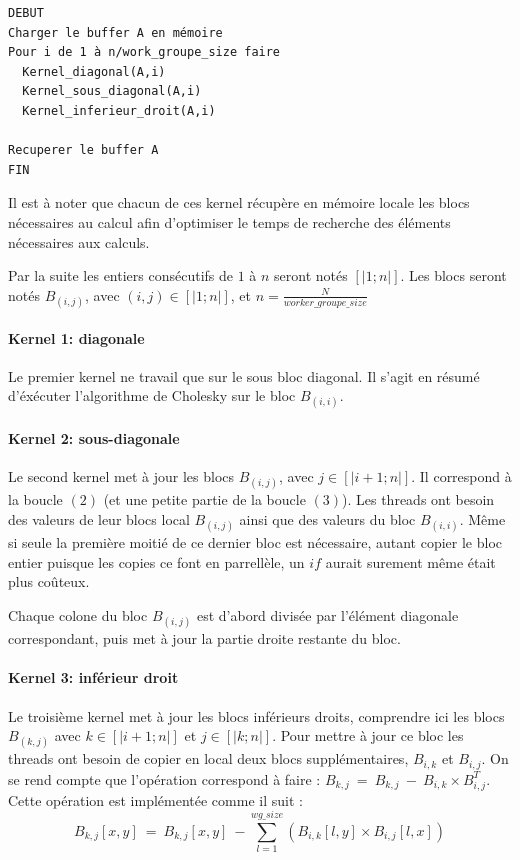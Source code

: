 \documentclass[paper=a4, fontsize=11pt]{scrartcl} %
\numberwithin{equation}{section} %
\numberwithin{figure}{section} %
\numberwithin{table}{section} %
\begin{document}
\begin{verbatim}
DEBUT
Charger le buffer A en mémoire
Pour i de 1 à n/work_groupe_size faire
  Kernel_diagonal(A,i)
  Kernel_sous_diagonal(A,i)
  Kernel_inferieur_droit(A,i)

Recuperer le buffer A
FIN
\end{verbatim}

Il est à noter que chacun de ces kernel récupère en mémoire locale les
blocs nécessaires au calcul afin d'optimiser le temps de recherche des
éléments nécessaires aux calculs.

Par la suite les entiers consécutifs de $1$ à $n$ seront notés
$[|1;n|]$. Les blocs seront notés $B_{(i,j)}$, avec $(i,j)\in[|1;n|]$,
et $n = \frac{N}{worker\_groupe\_size}$


\paragraph{Kernel 1: diagonale}

Le premier kernel ne travail que sur le sous bloc diagonal. Il s'agit
en résumé d'éxécuter l'algorithme de Cholesky sur le bloc $B_{(i,i)}$.

\paragraph{Kernel 2: sous-diagonale} 

Le second kernel met à jour les blocs $B_{(i,j)}$, avec
$j\in[|i+1;n|]$. Il correspond à la boucle $(2)$ (et une petite partie
de la boucle $(3)$).  Les threads ont besoin des valeurs de leur blocs
local $B_{(i,j)}$ ainsi que des valeurs du bloc $B_{(i,i)}$. Même si
seule la première moitié de ce dernier bloc est nécessaire, autant
copier le bloc entier puisque les copies ce font en parrellèle, un
$if$ aurait surement même était plus coûteux.

Chaque colone du bloc $B_{(i,j)}$ est d'abord divisée par l'élément
diagonale correspondant, puis met à jour la partie droite restante du
bloc.

\paragraph{Kernel 3: inférieur droit} 

Le troisième kernel met à jour les blocs inférieurs droits, comprendre
ici les blocs $B_{(k,j)}$ avec $k\in[|i+1;n|]$ et $j\in[|k;n|]$. Pour
mettre à jour ce bloc les threads ont besoin de copier en local deux
blocs supplémentaires, $B_{i,k}$ et $B_{i,j}$. On se rend compte que
l'opération correspond à faire : $B_{k,j}\ =\ B_{k,j}\ -\ B_{i,k}
\times B_{i,j}^T$. Cette opération est implémentée comme il suit :
$$B_{k,j}[x,y]\ =\ B_{k,j}[x,y]\ - \sum_{l=1}^{wg\_size}(B_{i,k}[l,y]
\times B_{i,j}[l,x])$$
\end{document}
